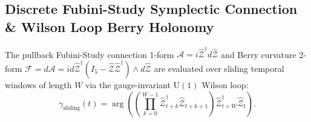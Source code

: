 \subsection{Discrete Fubini-Study Symplectic Connection \& Wilson Loop Berry Holonomy}
The pullback Fubini-Study connection 1-form $\mathcal{A} = i \hat{\mathcal{Z}}^\dagger d\hat{\mathcal{Z}}$ and Berry curvature 2-form $\mathcal{F} = d\mathcal{A} = i d\hat{\mathcal{Z}}^\dagger (I_5 - \hat{\mathcal{Z}}\hat{\mathcal{Z}}^\dagger) \wedge d\hat{\mathcal{Z}}$ are evaluated over sliding temporal windows of length $W$ via the gauge-invariant $\mathrm{U}(1)$ Wilson loop:
\begin{equation}
\gamma_{\text{sliding}}(t) = \arg \left( \left( \prod_{k=0}^{W-1} \hat{\mathcal{Z}}_{t+k}^\dagger \hat{\mathcal{Z}}_{t+k+1} \right) \hat{\mathcal{Z}}_{t+W}^\dagger \hat{\mathcal{Z}}_t \right).
\end{equation}
